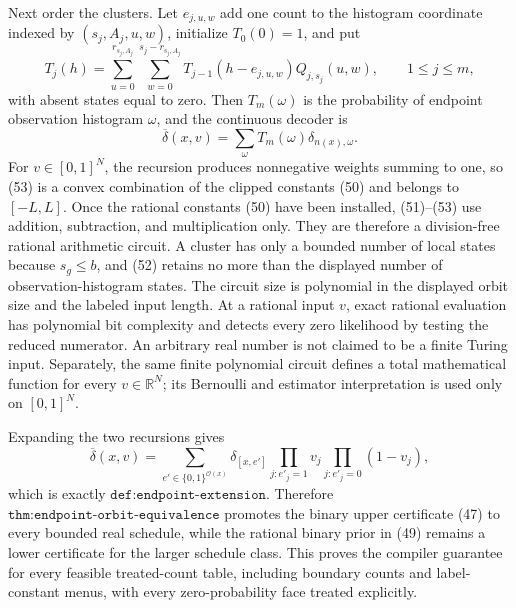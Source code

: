 Next order the clusters.  Let \(e_{j,u,w}\) add one count to the histogram coordinate indexed by \((s_j,A_j,u,w)\), initialize \(T_0(0)=1\), and put
\[
 T_j(h)=
 \sum_{u=0}^{r_{s_j,A_j}}
 \sum_{w=0}^{s_j-r_{s_j,A_j}}
 T_{j-1}(h-e_{j,u,w})Q_{j,s_j}(u,w),
 \qquad 1\le j\le m,
\tag{52}
\]
with absent states equal to zero.  Then \(T_m(\omega)\) is the probability of endpoint observation histogram \(\omega\), and the continuous decoder is
\[
 \overline\delta(x,v)=
 \sum_\omega T_m(\omega)\delta_{n(x),\omega}.
\tag{53}
\]
For \(v\in[0,1]^N\), the recursion produces nonnegative weights summing to one, so (53) is a convex combination of the clipped constants (50) and belongs to \([-L,L]\).
Once the rational constants (50) have been installed, (51)--(53) use addition, subtraction, and multiplication only.  They are therefore a division-free rational arithmetic circuit.  A cluster has only a bounded number of local states because \(s_g\le b\), and (52) retains no more than the displayed number of observation-histogram states.  The circuit size is polynomial in the displayed orbit size and the labeled input length.  At a rational input \(v\), exact rational evaluation has polynomial bit complexity and detects every zero likelihood by testing the reduced numerator.  An arbitrary real number is not claimed to be a finite Turing input.  Separately, the same finite polynomial circuit defines a total mathematical function for every \(v\in\mathbb R^N\); its Bernoulli and estimator interpretation is used only on \([0,1]^N\).

Expanding the two recursions gives
\[
 \overline\delta(x,v)=
 \sum_{e'\in\{0,1\}^{\mathcal O(x)}}
 \delta_{[x,e']}
 \prod_{j:e'_j=1}v_j
 \prod_{j:e'_j=0}(1-v_j),
\tag{54}
\]
which is exactly \(\texttt{def:endpoint-extension}\).  Therefore \(\texttt{thm:endpoint-orbit-equivalence}\) promotes the binary upper certificate (47) to every bounded real schedule, while the rational binary prior in (49) remains a lower certificate for the larger schedule class.  This proves the compiler guarantee for every feasible treated-count table, including boundary counts and label-constant menus, with every zero-probability face treated explicitly.
